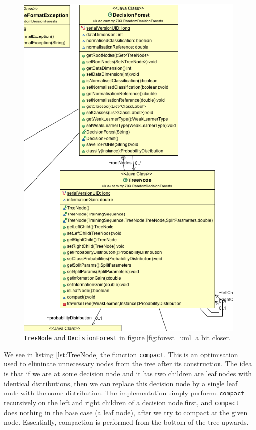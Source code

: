 \documentclass[12pt,twoside,notitlepage]{report}
\begin{document}
                \begin{figure}[H]
                    \centering
                    \includegraphics[scale=0.5]{Tree_Forest_UML}
                    \caption{\texttt{TreeNode} and \texttt{DecisionForest} in figure \ref{fig:forest_uml} a bit closer.}
                    \label{fig:weak_learner_uml}
                \end{figure}

                We see in listing \ref{lst:TreeNode} the function \texttt{compact}. This is an optimisation 
                used to eliminate unnecessary nodes from the tree after its construction. The idea is that if we are at 
                some decision node and it has two children are leaf nodes with identical distributions, then we 
                can replace this decision node by a single leaf node with the same distribution. The implementation 
                simply performs \texttt{compact} recursively on the left and right children of a decision node first, 
                and \texttt{compact} does nothing in the base case (a leaf node), after we try to compact at the 
                given node. Essentially, compaction is performed from the bottom of the tree upwards.
\end{document}
